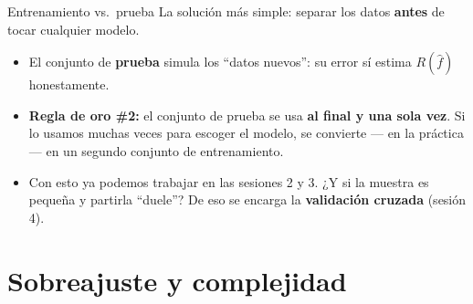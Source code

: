 \documentclass{beamer}
\newcommand{\1}{\mathbb{I}}
\begin{document}
\begin{frame}{Entrenamiento vs.\ prueba}
\small
La solución más simple: separar los datos \textbf{antes} de tocar cualquier modelo.

\vspace{0.3cm}
\begin{center}
\end{center}
\pause

\vspace{0.3cm}
\begin{itemize}\itemsep4pt
  \item El conjunto de \textbf{prueba} simula los ``datos nuevos'': su error sí estima $R(\hat{f})$ honestamente.
  \item \textbf{Regla de oro \#2:} el conjunto de prueba se usa \textbf{al final y una sola vez}. Si lo usamos muchas veces para escoger el modelo, se convierte --- en la práctica --- en un segundo conjunto de entrenamiento. \pause
  \item Con esto ya podemos trabajar en las sesiones 2 y 3. ¿Y si la muestra es pequeña y partirla ``duele''? De eso se encarga la \textbf{validación cruzada} (sesión 4).
\end{itemize}
\end{frame}


\section{Sobreajuste y complejidad}
\begin{frame}[noframenumbering]
\tableofcontents[currentsection]
\end{frame}
\end{document}
